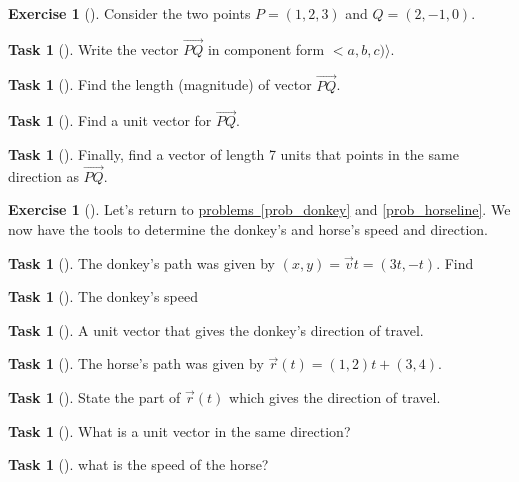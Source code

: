 \documentclass[10pt,]{book}
\theoremstyle{plain}
\theoremstyle{definition}
\theoremstyle{definition}
\theoremstyle{definition}
\theoremstyle{definition}
\newtheorem{exploration}[project]{Exercise}
\newtheorem{task}[project]{Task}
\theoremstyle{definition}
\numberwithin{equation}{section}
\newcommand{\lt}{<}
\begin{document}
\begin{exploration}[]\label{exploration-25}
Consider the two points \(P=(1,2,3)\) and \(Q=(2,-1,0)\).%
\begin{task}[]\label{task-46}
Write the vector \(\vec {PQ}\) in component form \(\lt a,b,c)\rangle\).%
\end{task}
\begin{task}[]\label{task-47}
Find the length (magnitude) of vector \(\vec {PQ}\).%
\end{task}
\begin{task}[]\label{task-48}
Find a unit vector for \(\vec{PQ}\).%
\end{task}
\begin{task}[]\label{task-49}
Finally, find a vector of length 7 units that points in the same direction as \(\vec{PQ}\).%
\end{task}
\end{exploration}
\begin{exploration}[]\label{exploration-26}
Let's return to \hyperref[prob_donkey]{problems~\ref{prob_donkey}} and \hyperref[prob_horseline]{\ref{prob_horseline}}. We now have the tools to determine the donkey's and horse's speed and direction.%
\begin{task}[]\label{task-50}
The donkey's path was given by \((x,y)=\vec v t = (3t,-t)\). Find%
\begin{task}[]\label{task-51}
The donkey's speed%
\end{task}
\begin{task}[]\label{task-52}
A unit vector that gives the donkey's direction of travel.%
\end{task}
\end{task}
\begin{task}[]\label{task-53}
The horse's path was given by \(\vec r(t) = (1,2)t + (3,4)\).%
\begin{task}[]\label{task-54}
State the part of \(\vec r(t)\) which gives the direction of travel.%
\end{task}
\begin{task}[]\label{task-55}
What is a unit vector in the same direction?%
\end{task}
\begin{task}[]\label{task-56}
what is the speed of the horse?%
\end{task}
\end{task}
\end{exploration}
\typeout{************************************************}
\typeout{************************************************}
\end{document}
